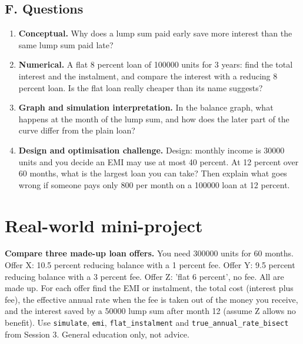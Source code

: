 \documentclass[11pt,a4paper]{article}
\begin{document}
\subsection*{F. Questions}
\begin{enumerate}[nosep]
\item \textbf{Conceptual.} Why does a lump sum paid early save more interest than the same lump sum paid late?
\item \textbf{Numerical.} A flat 8 percent loan of 100000 units for 3 years: find the total interest and the instalment, and compare the interest with a reducing 8 percent loan. Is the flat loan really cheaper than its name suggests?
\item \textbf{Graph and simulation interpretation.} In the balance graph, what happens at the month of the lump sum, and how does the later part of the curve differ from the plain loan?
\item \textbf{Design and optimisation challenge.} Design: monthly income is 30000 units and you decide an EMI may use at most 40 percent. At 12 percent over 60 months, what is the largest loan you can take? Then explain what goes wrong if someone pays only 800 per month on a 100000 loan at 12 percent.
\end{enumerate}

\section{Real-world mini-project}
\textbf{Compare three made-up loan offers.} You need 300000 units for 60 months. Offer X: 10.5 percent reducing balance with a 1 percent fee. Offer Y: 9.5 percent reducing balance with a 3 percent fee. Offer Z: 'flat 6 percent', no fee. All are made up. For each offer find the EMI or instalment, the total cost (interest plus fee), the effective annual rate when the fee is taken out of the money you receive, and the interest saved by a 50000 lump sum after month 12 (assume Z allows no benefit). Use \texttt{simulate}, \texttt{emi}, \texttt{flat\_instalment} and \texttt{true\_annual\_rate\_bisect} from Session 3. General education only, not advice.
\end{document}
